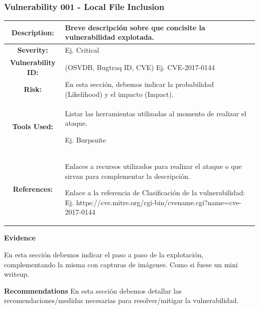 \documentclass[a4paper]{article} %
\begin{document}
    \subsubsection{\textbf{Vulnerability 001 - Local File Inclusion}}
    \begin{table}[htbp]
        \begin{tabularx}{\textwidth}{|c|X|}
            \hline
            \cellcolor{lightgray}\textbf{Description:} & 
            {
                Breve descripción sobre que concisite la vulnerabilidad explotada.
            } \\
            \hline
            \cellcolor{lightgray}\textbf{Severity:} &
            {
                Ej. Critical
            } \\
            \hline
            \cellcolor{lightgray}\textbf{Vulnerability ID:} &
            {
                    (OSVDB, Bugtraq ID, CVE) Ej. CVE-2017-0144
            } \\
            \hline
            \cellcolor{lightgray}\textbf{Risk:} &
            {
                En esta sección, debemos indicar la probabilidad (Likelihood) y el impacto (Impact).
            } \\
            \hline
            \cellcolor{lightgray}\textbf{Tools Used:} &
            {
                Listar las herramientas utilizadas al momento de realizar el ataque.
                
                Ej. Burpsuite
            } \\
            \hline
            \cellcolor{lightgray}\textbf{References:} &
            {
                Enlaces a recursos utilizados para realizar el ataque o que sirvan para complementar la descripción.
                
                Enlace a la referencia de Clasificación de la vulnerabilidad:
                Ej. https://cve.mitre.org/cgi-bin/cvename.cgi?name=cve-2017-0144
            } \\
            \hline
        \end{tabularx}
    \end{table}

    \textbf{Evidence}

    En esta sección debemos indicar el paso a paso de la explotación, complementando la misma con capturas de imágenes.
    Como si fuese un mini writeup.

    \textbf{Recommendations}
    En esta sección debemos detallar las recomendaciones/medidas necesarias para resolver/mitigar la vulnerabilidad.
\end{document}
